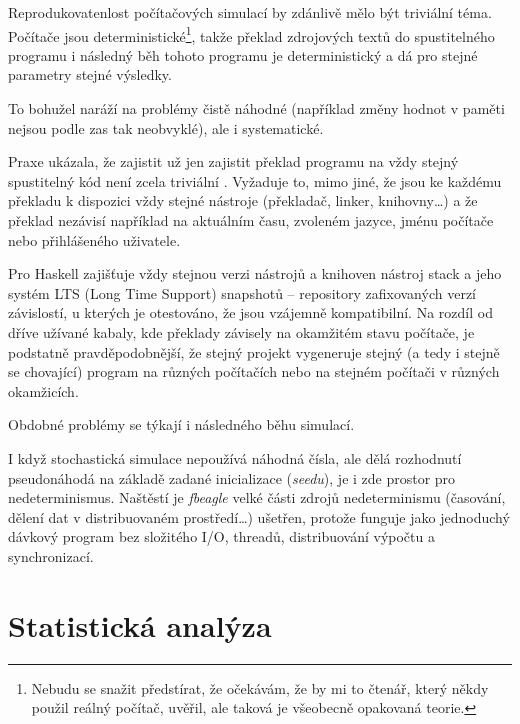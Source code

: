 \begin{tcolorbox}[ title={Reprodukovatelnost v počítačových simulacích}
                 , breakable
                 ]
Reprodukovatenlost počítačových simulací by zdánlivě mělo být triviální téma. Počítače jsou
deterministické\footnote{
Nebudu se snažit předstírat, že očekávám, že by mi to čtenář, který někdy použil reálný počítač, uvěřil, ale
taková je všeobecně opakovaná teorie.
}, takže překlad zdrojových textů do spustitelného programu i následný běh tohoto
programu je deterministický a dá pro stejné parametry stejné výsledky.

To bohužel naráží na problémy čistě náhodné (například  změny hodnot v paměti
nejsou podle \citet{schroeder2011dram} zas tak neobvyklé), ale i systematické.

Praxe ukázala, že zajistit už jen zajistit překlad programu na vždy stejný spustitelný kód není zcela triviální \citep{bobbio2014reproducibl}.
Vyžaduje to, mimo jiné, že jsou ke každému překladu k dispozici vždy stejné nástroje (překladač, linker,
knihovny\ldots) a že překlad nezávisí například na aktuálním času, zvoleném jazyce, jménu počítače nebo přihlášeného uživatele.

Pro Haskell zajišťuje vždy stejnou verzi nástrojů a knihoven nástroj stack a jeho systém
LTS (Long Time Support) snapshotů -- repository zafixovaných verzí závislostí, u kterých je
otestováno, že jsou vzájemně kompatibilní. Na rozdíl od dříve užívané kabaly, kde překlady
závisely na okamžitém stavu počítače, je podstatně pravděpodobnější, že stejný projekt vygeneruje
stejný (a tedy i stejně se chovající) program na různých počítačích nebo na stejném počítači v různých
okamžicích.

Obdobné problémy se týkají i následného běhu simulací.

I když stochastická simulace nepoužívá náhodná čísla, ale dělá rozhodnutí pseudonáhodá na základě zadané inicializace
(\textit{seedu}), je i zde prostor pro nedeterminismus. Naštěstí je \textit{fbeagle} velké části zdrojů
nedeterminismu (časování, dělení dat v distribuovaném prostředí\ldots) ušetřen, protože funguje jako
jednoduchý dávkový program bez složitého I/O, threadů, distribuování výpočtu a synchronizací.
\end{tcolorbox}


\section{Statistická analýza}

